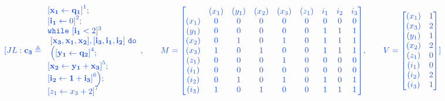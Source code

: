 \documentclass[a4paper,11pt]{article}
\begin{document}
\[
\jl{\ssa{c_3} \triangleq
\begin{array}{l}
     \left[\ssa{ x_1 \leftarrow q_1}  \right]^1 ; \\
     \left[\ssa{i_1} \leftarrow 0 \right]^2 ; \\
    \ewhile
     ~ [\ssa{i_1} < 2]^3
  \\
     ~\ssa{[ x_3,x_1 ,x_2 ], [i_3, i_1, i_2] }
     ~ \edo \\
    ~ \Big( 
    \left[\ssa{ y_1 \leftarrow q_2} \right]^4; \\
    \left[\ssa{x_2 \leftarrow y_1  + x_3 } \right]^5;\\
    \left[\ssa{i_2 \leftarrow 1  + i_3 } \right]^6
    \Big) ; \\
     \left[ \assign{z_1}{x_3 + 2}  \right]^{7}
\end{array}
,
~~~~~~
M =  \left[ \begin{matrix}
 & (x_1)  & (y_1) & (x_2) & (x_3) &  (z_1) & i_1 & i_2 & i_3\\
(x_1) & 0 & 0 & 0 & 0 & 0 & 0 & 0 & 0 \\
(y_1) & 0 & 0 & 0 & 0 & 0 & 1 & 1 & 1\\
(x_2) & 0 & 1 & 0 & 1 & 0 & 1 & 1 & 1\\
(x_3) & 1 & 0  & 1& 0 & 0 & 1 & 1 & 1\\
(z_1) & 0 & 0 & 0 & 1 & 0 & 0 & 0 & 0 \\
(i_1) & 0 & 0 & 0 & 0 & 0 & 0 & 0 & 0\\
(i_2) & 0 & 1 & 0 & 1 & 0 & 1 & 0 & 1\\
(i_3) & 1 & 0  & 1& 0 & 0 & 1 & 1 & 1\\
\end{matrix} \right]
,
~~~~~~
V = \left [ \begin{matrix}
(x_1) & 1 \\
(x_3) & 2 \\
(y_1) & 1 \\
(x_2) & 2 \\
(z_1) & 0 \\
(i_1) & 0 \\
(i_2) & 2 \\
(i_3) & 1 
\end{matrix} \right ]
}
\]
%
\end{document}
